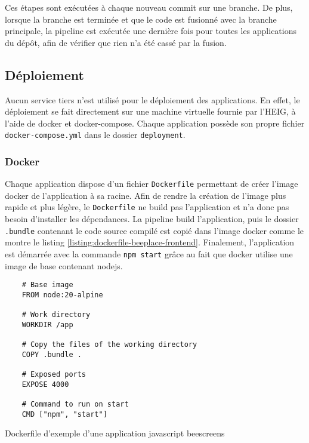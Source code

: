 Ces étapes sont exécutées à chaque nouveau commit sur une branche. De plus, lorsque la branche est terminée et que le code est fusionné avec la branche principale, la pipeline est exécutée une dernière fois pour toutes les applications du dépôt, afin de vérifier que rien n'a été cassé par la fusion.

\subsection{Déploiement}
\label{sec:deploiement}

Aucun service tiers n'est utilisé pour le déploiement des applications. En effet, le déploiement se fait directement sur une machine virtuelle fournie par l'HEIG, à l'aide de \gls{docker} et \gls{docker-compose}. Chaque application possède son propre fichier \texttt{docker-compose.yml} dans le dossier \texttt{deployment}.

\subsubsection{Docker}

Chaque application dispose d'un fichier \texttt{Dockerfile} permettant de créer l'image \gls{docker} de l'application à sa racine. Afin de rendre la création de l'image plus rapide et plus légère, le \texttt{Dockerfile} ne build pas l'application et n'a donc pas besoin d'installer les dépendances. La pipeline build l'application, puis le dossier \texttt{.bundle} contenant le code source compilé est copié dans l'image \gls{docker} comme le montre le listing \ref{listing:dockerfile-beeplace-frontend}. Finalement, l'application est démarrée avec la commande \texttt{npm start} grâce au fait que \gls{docker} utilise une image de base contenant \gls{nodejs}.

\begin{listing}[H]
  \begin{verbatim}
    # Base image
    FROM node:20-alpine

    # Work directory
    WORKDIR /app

    # Copy the files of the working directory
    COPY .bundle .

    # Exposed ports
    EXPOSE 4000

    # Command to run on start
    CMD ["npm", "start"]
\end{verbatim}
  \caption{Dockerfile d'exemple d'une application \gls{javascript} \gls{beescreens}}
  \label{listing:dockerfile-beeplace-frontend}
\end{listing}

